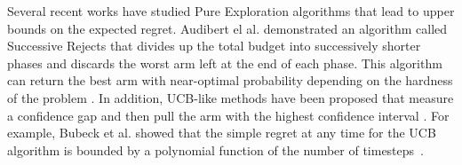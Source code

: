 \documentclass[journal,transmag]{IEEEtran}%
\begin{document}
Several recent works have studied Pure Exploration algorithms that lead to upper bounds on the expected regret.
Audibert el al. demonstrated an algorithm called Successive Rejects that divides up the total budget into successively shorter phases and discards the worst arm left at the end of each phase.
This algorithm can return the best arm with near-optimal probability depending on the hardness of the problem \cite{audibert2010best}.
In addition, UCB-like methods have been proposed that measure a confidence gap and then pull the arm with the highest confidence interval \cite{gabillon2012best}.
For example, Bubeck et al. showed that the simple regret at any time for the UCB algorithm is bounded by a polynomial function of the number of timesteps~\cite{bubeck2009pure}.


\end{document}
